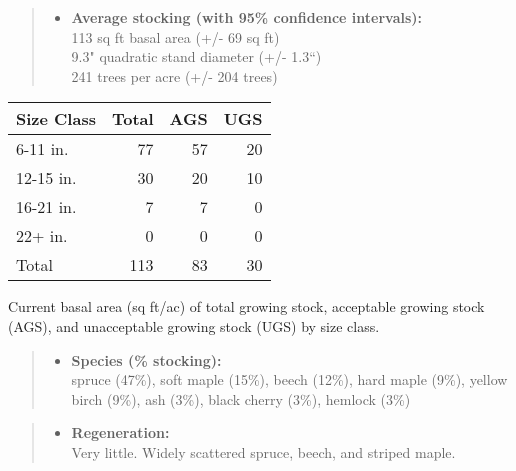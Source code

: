 \documentclass[]{tufte-handout}
\providecommand{\tightlist}{%
  \setlength{\itemsep}{0pt}\setlength{\parskip}{0pt}}
\begin{document}
\begin{quote}
\begin{itemize}
\tightlist
\item
  \textbf{Average stocking (with 95\% confidence intervals):}\\
  \vspace{2pt} 113 sq ft basal area (+/- 69 sq ft)\\
  9.3" quadratic stand diameter (+/- 1.3``)\\
  241 trees per acre (+/- 204 trees)\\
  \vspace{8pt}
\end{itemize}
\end{quote}

\begin{tabular}{lrrr}
\toprule
Size Class & Total & AGS & UGS\\
\midrule
6-11 in. & 77 & 57 & 20\\
12-15 in. & 30 & 20 & 10\\
16-21 in. & 7 & 7 & 0\\
22+ in. & 0 & 0 & 0\\
Total & 113 & 83 & 30\\
\bottomrule
\end{tabular}

\vspace{2pt}
\footnotesize\parbox{200pt}{Current basal area (sq ft/ac) of total growing stock, acceptable growing stock (AGS), and unacceptable growing stock (UGS) by size class.}\normalsize

\begin{quote}
\begin{itemize}
\tightlist
\item
  \textbf{Species (\% stocking):}\\
  \vspace{2pt} spruce (47\%), soft maple (15\%), beech (12\%), hard
  maple (9\%), yellow birch (9\%), ash (3\%), black cherry (3\%),
  hemlock (3\%)
\end{itemize}
\end{quote}

\begin{quote}
\begin{itemize}
\tightlist
\item
  \textbf{Regeneration:}\\
  \vspace{2pt} Very little. Widely scattered spruce, beech, and striped
  maple.
\end{itemize}
\end{quote}
\end{document}

